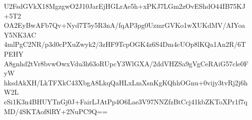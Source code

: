 U2FsdGVkX18MgzgwO2J10JarEjHGLrAe5h+xPKJ7LGm2zOvEShdO44IB75KJ+5T2
OA2EyBwAFb7Qv+Nyd7T5y5R3nA/fqAP3pg0UzmrGVKo1wXUKdMV/AIYoaY5NK3AC
4mlPgC2NR/p3d0cPXuZwyk2/3zHF9TcpOGK4z6S4Dm4cUOp8lKQa1An2R/6TPEHY
A8gnhd2tVr8bvwOwxVdu3h63oRUpcY3WlGXA/2ddVHZSa9gVgCeRAiG57cle0FyW
hksdAkXH/LkTFXkC43XbgA8LkqQaHLxLmXsnKgKQhhOGnu+0vijy3tvRj2j6hW2L
eSi1K3n4BHUYTnGj0J+FairLJAtPp4O6Lae3V97NNZfzBtCcj41kbZKToXPr1f7q
MD/4SKTAof8lRY+2NuPC9Q==
